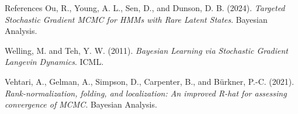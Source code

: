 \documentclass[aspectratio=169]{beamer}
\begin{document}
\begin{frame}{References}
  \footnotesize
  Ou, R., Young, A. L., Sen, D., and Dunson, D. B. (2024).
  \textit{Targeted Stochastic Gradient MCMC for HMMs with Rare Latent States}.
  Bayesian Analysis.

  \vspace{0.8em}
  Welling, M. and Teh, Y. W. (2011).
  \textit{Bayesian Learning via Stochastic Gradient Langevin Dynamics}.
  ICML.

  \vspace{0.8em}
  Vehtari, A., Gelman, A., Simpson, D., Carpenter, B., and Bürkner, P.-C. (2021).
  \textit{Rank-normalization, folding, and localization: An improved R-hat for assessing convergence of MCMC}.
  Bayesian Analysis.
\end{frame}
\end{document}

